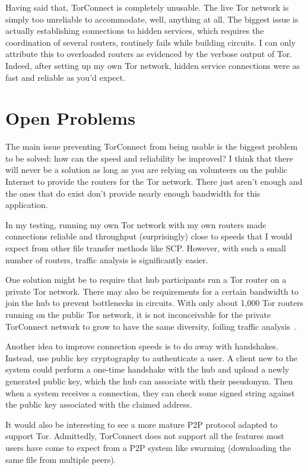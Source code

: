 \documentclass{article}
\begin{document}
Having said that, TorConnect is completely unusable.  The live Tor network is simply too unreliable to accommodate, well, anything at all.  The biggest issue is actually establishing connections to hidden services, which requires the coordination of several routers, routinely fails while building circuits.  I can only attribute this to overloaded routers as evidenced by the verbose output of Tor.  Indeed, after setting up my own Tor network, hidden service connections were as fast and reliable as you'd expect.

\section{Open Problems}
The main issue preventing TorConnect from being usable is the biggest problem to be solved: how can the speed and reliability be improved?  I think that there will never be a solution as long as you are relying on volunteers on the public Internet to provide the routers for the Tor network.  There just aren't enough and the ones that do exist don't provide nearly enough bandwidth for this application.

In my testing, running my own Tor network with my own routers made connections reliable and throughput (surprisingly) close to speeds that I would expect from other file transfer methods like SCP.  However, with such a small number of routers, traffic analysis is significantly easier.

One solution might be to require that hub participants run a Tor router on a private Tor network.  There may also be requirements for a certain bandwidth to join the hub to prevent bottlenecks in circuits.  With only about 1,000 Tor routers running on the public Tor network, it is not inconceivable for the private TorConnect network to grow to have the same diversity, foiling traffic analysis~\cite{tor-numrouters}.

Another idea to improve connection speeds is to do away with handshakes.  Instead, use public key cryptography to authenticate a user.  A client new to the system could perform a one-time handshake with the hub and upload a newly generated public key, which the hub can associate with their pseudonym.  Then when a system receives a connection, they can check some signed string against the public key associated with the claimed address.

It would also be interesting to see a more mature P2P protocol adapted to support Tor.  Admittedly, TorConnect does not support all the features most users have come to expect from a P2P system like swarming (downloading the same file from multiple peers).
\end{document}
